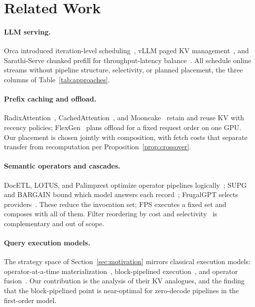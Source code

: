 \documentclass[10pt,twocolumn]{article}
\begin{document}
\section{Related Work}
\label{sec:related}

\paragraph{LLM serving.} Orca introduced iteration-level scheduling~\cite{orca}, vLLM paged KV management~\cite{vllm}, and Sarathi-Serve chunked prefill for throughput-latency balance~\cite{sarathi}. All schedule online streams without pipeline structure, selectivity, or planned placement, the three columns of Table~\ref{tab:approaches}.

\paragraph{Prefix caching and offload.} RadixAttention~\cite{sglang}, CachedAttention~\cite{cachedattention}, and Mooncake~\cite{mooncake} retain and reuse KV with recency policies; FlexGen~\cite{flexgen} plans offload for a fixed request order on one GPU. Our placement is chosen jointly with composition, with fetch costs that separate transfer from recomputation per Proposition~\ref{prop:crossover}.

\paragraph{Semantic operators and cascades.} DocETL, LOTUS, and Palimpzest optimize operator pipelines logically~\cite{docetl,lotus,palimpzest}; SUPG and BARGAIN bound which model answers each record~\cite{supg,bargain}; FrugalGPT selects providers~\cite{frugalgpt}. These reduce the invocation set; FPS executes a fixed set and composes with all of them. Filter reordering by cost and selectivity~\cite{predmig,probpred} is complementary and out of scope.

\paragraph{Query execution models.} The strategy space of Section~\ref{sec:motivation} mirrors classical execution models: operator-at-a-time materialization~\cite{graefe-survey}, block-pipelined execution~\cite{monetx100}, and operator fusion~\cite{hyper}. Our contribution is the analysis of their KV analogues, and the finding that the block-pipelined point is near-optimal for zero-decode pipelines in the first-order model.
\end{document}
